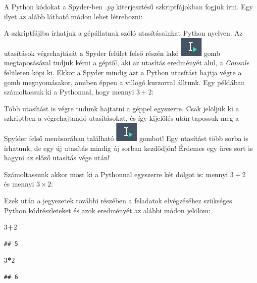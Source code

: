 \documentclass[
]{book}
\newenvironment{Shaded}{\begin{snugshade}}{\end{snugshade}}
\newcommand{\DecValTok}[1]{\textcolor[rgb]{0.00,0.00,0.81}{#1}}
\newcommand{\OperatorTok}[1]{\textcolor[rgb]{0.81,0.36,0.00}{\textbf{#1}}}
\begin{document}
A Python kódokat a Spyder-ben \emph{.py} kiterjesztésű szkriptfájokban fogjuk írni.
Egy ilyet az alább látható módon lehet létrehozni:

A szkriptfájlba írhatjuk a gépállatnak szóló utasításainkat Python nyelven. Az utasítások végrehajtását a Spyder felület felső részén lakó \includegraphics{RunLine.jpg} gomb megtaposásával tudjuk kérni a géptől, aki az utasítás eredményét alul, a \emph{Console} felületen köpi ki. Ekkor a Spyder mindig azt a Python utasítást hajtja végre a gomb megnyomásakor, amiben éppen a villogó kurzorral álltunk.
Egy példában számoltassuk ki a Pythonnal, hogy mennyi \(3+2\):

Több utasítást is végre tudunk hajtatni a géppel egyszerre. Csak jelöljük ki a szkriptben a végrehajtandó utasításokat, és így kijelölés után tapossuk meg a Spyíder felső menüsorában található \includegraphics{RunLine.jpg} gombot!
Egy utasítást több sorba is írhatunk, de egy új utasítás mindig új sorban kezdődjön! Érdemes egy üres sort is hagyni az előző utasítás vége után!

Számoltassunk akkor most ki a Pythonnal egyszerre két dolgot is: mennyi \(3+2\) és mennyi \(3 \times 2\):

Ezek után a jegyezetek további részében a feladatok elvégzéséhez szükséges Python kódrészleteket és azok eredményét az alábbi módon jelölöm:

\begin{Shaded}
\begin{Highlighting}[]
\DecValTok{3}\OperatorTok{+}\DecValTok{2}
\end{Highlighting}
\end{Shaded}

\begin{verbatim}
## 5
\end{verbatim}

\begin{Shaded}
\begin{Highlighting}[]
\DecValTok{3}\OperatorTok{*}\DecValTok{2}
\end{Highlighting}
\end{Shaded}

\begin{verbatim}
## 6
\end{verbatim}
\end{document}
